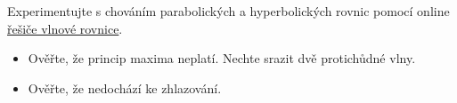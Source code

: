 Experimentujte s chováním parabolických a hyperbolických rovnic pomocí 
online \href{http://math.uchicago.edu/~luis/pde/wave.html}{řešiče vlnové rovnice}.
\begin{itemize}
 \item Ověřte, že princip maxima neplatí. Nechte srazit dvě protichůdné vlny.
 \item Ověřte, že nedochází ke zhlazování.
\end{itemize}







  
%   
% 
% 
% 
% 
% 
% 




